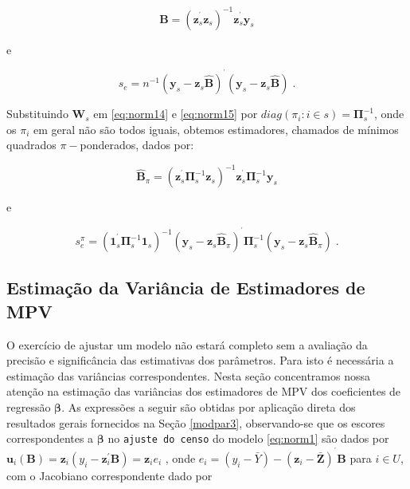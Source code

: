 \documentclass[]{book}
\numberwithin{example}{chapter}
\numberwithin{remark}{chapter}
\numberwithin{definition}{chapter}
\begin{document}
\begin{equation}
\widehat{\mathbf{B}}=\left( \mathbf{z}_{s}^{^{\prime }}\mathbf{z}_{s}\right)
^{-1}\mathbf{z}_{s}^{^{\prime }}\mathbf{y}_{s}  \label{eq:norm16}
\end{equation}

e

\begin{equation}
s_{e}=n^{-1}\left( \mathbf{y}_{s}-\mathbf{z}_{s}\widehat{\mathbf{B}}\right)
^{^{\prime }}\left( \mathbf{y}_{s}-\mathbf{z}_{s}\widehat{\mathbf{B}}\right)
\;.  \label{eq:norm17}
\end{equation}

Substituindo \(\mathbf{W}_{s}\) em \eqref{eq:norm14} e \eqref{eq:norm15} por
\(diag\left( \pi _{i}:i\in s\right) =\mathbf{\Pi }_{s}^{-1}\), onde os
\(\pi _{i}\) em geral não são todos iguais, obtemos estimadores,
chamados de mínimos quadrados \(\pi -\)ponderados, dados por:

\begin{equation}
\widehat{\mathbf{B}}_{\pi }=\left( \mathbf{z}_{s}^{^{\prime }}\mathbf{\Pi }
_{s}^{-1}\mathbf{z}_{s}\right) ^{-1}\mathbf{z}_{s}^{^{\prime }}\mathbf{\Pi }
_{s}^{-1}\mathbf{y}_{s}  \label{eq:norm18}
\end{equation}

e

\begin{equation}
s_{e}^{\pi }=\left( \mathbf{1}_{s}^{^{\prime }}\mathbf{\Pi }_{s}^{-1}\mathbf{
1}_{s}\right) ^{-1}\left( \mathbf{y}_{s}-\mathbf{z}_{s}\widehat{\mathbf{B}}
_{\pi }\right) ^{^{\prime }}\mathbf{\Pi }_{s}^{-1}\left( \mathbf{y}_{s}-
\mathbf{z}_{s}\widehat{\mathbf{B}}_{\pi }\right) \;.  \label{eq:norm19}
\end{equation}

\subsection{Estimação da Variância de Estimadores de
MPV}\label{estimacao-da-variancia-de-estimadores-de-mpv}

O exercício de ajustar um modelo não estará completo sem a avaliação da
precisão e significância das estimativas dos parâmetros. Para isto é
necessária a estimação das variâncias correspondentes. Nesta seção
concentramos nossa atenção na estimação das variâncias dos estimadores
de MPV dos coeficientes de regressão \(\mathbf{\beta}\). As expressões a
seguir são obtidas por aplicação direta dos resultados gerais fornecidos
na Seção \ref{modpar3}, observando-se que os escores correspondentes a
\(\mathbf{\beta}\) no \texttt{ajuste\ do\ censo} do modelo
\eqref{eq:norm1} são dados por
\(\mathbf{u}_{i}\left( \mathbf{B}\right) =\mathbf{z}_{i}\left( y_{i}-\mathbf{z}_{i}^{\prime }\mathbf{B}\right) =\mathbf{z} _{i}e_{i}\)
, onde
\(e_{i}=\left( y_{i}-\bar{Y}\right) -\left( \mathbf{z}_{i}-\mathbf{\bar{Z}}\right) ^{^{\prime }}\mathbf{B}\)
para \(i\in U\), com o Jacobiano correspondente dado por
\end{document}
